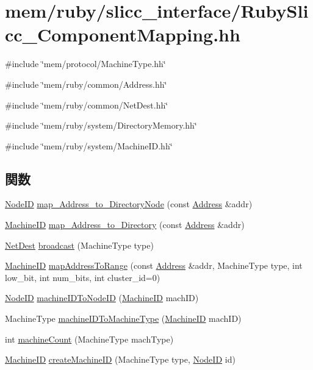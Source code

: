 \hypertarget{RubySlicc__ComponentMapping_8hh}{
\section{mem/ruby/slicc\_\-interface/RubySlicc\_\-ComponentMapping.hh}
\label{RubySlicc__ComponentMapping_8hh}
}
{\ttfamily \#include \char`\"{}mem/protocol/MachineType.hh\char`\"{}}\par
{\ttfamily \#include \char`\"{}mem/ruby/common/Address.hh\char`\"{}}\par
{\ttfamily \#include \char`\"{}mem/ruby/common/NetDest.hh\char`\"{}}\par
{\ttfamily \#include \char`\"{}mem/ruby/system/DirectoryMemory.hh\char`\"{}}\par
{\ttfamily \#include \char`\"{}mem/ruby/system/MachineID.hh\char`\"{}}\par
\subsection*{関数}
\begin{DoxyCompactItemize}
\item 
\hyperlink{TypeDefines_8hh_a83c14b4ae37e80071f6b3506a6c46151}{NodeID} \hyperlink{RubySlicc__ComponentMapping_8hh_a4bd5481fa181d267b902fe3825117932}{map\_\-Address\_\-to\_\-DirectoryNode} (const \hyperlink{classAddress}{Address} \&addr)
\item 
\hyperlink{structMachineID}{MachineID} \hyperlink{RubySlicc__ComponentMapping_8hh_aa36e0c9a077123ca73feb9afe15b1840}{map\_\-Address\_\-to\_\-Directory} (const \hyperlink{classAddress}{Address} \&addr)
\item 
\hyperlink{classNetDest}{NetDest} \hyperlink{RubySlicc__ComponentMapping_8hh_a366bb42c15ca556679ac10b479bc4d8d}{broadcast} (MachineType type)
\item 
\hyperlink{structMachineID}{MachineID} \hyperlink{RubySlicc__ComponentMapping_8hh_ac9143afac20963e128e48ed7629da9d0}{mapAddressToRange} (const \hyperlink{classAddress}{Address} \&addr, MachineType type, int low\_\-bit, int num\_\-bits, int cluster\_\-id=0)
\item 
\hyperlink{TypeDefines_8hh_a83c14b4ae37e80071f6b3506a6c46151}{NodeID} \hyperlink{RubySlicc__ComponentMapping_8hh_ab3f39dc0ba9b41811c448c63a9dab171}{machineIDToNodeID} (\hyperlink{structMachineID}{MachineID} machID)
\item 
MachineType \hyperlink{RubySlicc__ComponentMapping_8hh_aa054eb921191818fb53a5d26e5a61338}{machineIDToMachineType} (\hyperlink{structMachineID}{MachineID} machID)
\item 
int \hyperlink{RubySlicc__ComponentMapping_8hh_a1250f76522e6deb7118fe2c84d16ed84}{machineCount} (MachineType machType)
\item 
\hyperlink{structMachineID}{MachineID} \hyperlink{RubySlicc__ComponentMapping_8hh_abf6136c785cbdaa0fc2ff047af75152b}{createMachineID} (MachineType type, \hyperlink{TypeDefines_8hh_a83c14b4ae37e80071f6b3506a6c46151}{NodeID} id)
\end{DoxyCompactItemize}


